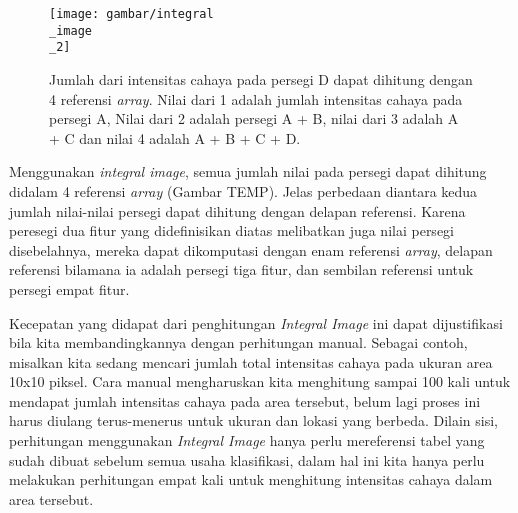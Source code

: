 \begin{figure}[H]
  \centering{}
	\texttt{[image: gambar/integral\\\_image\\\_2]}
  \caption{Jumlah dari intensitas cahaya pada persegi D dapat dihitung dengan 4 referensi \textit{array}. Nilai dari 1 adalah jumlah intensitas cahaya pada persegi A, Nilai dari 2 adalah persegi A + B, nilai dari 3 adalah A + C dan nilai 4 adalah A + B + C + D.}
\end{figure}

Menggunakan \emph{integral image}, semua jumlah nilai pada persegi dapat 
dihitung didalam 4 referensi \emph{array} (Gambar TEMP). Jelas perbedaan 
diantara kedua jumlah nilai-nilai persegi dapat dihitung 
dengan delapan referensi. Karena peresegi dua fitur yang 
didefinisikan diatas melibatkan juga nilai persegi disebelahnya, 
mereka dapat dikomputasi dengan enam referensi \emph{array}, delapan referensi
bilamana ia adalah persegi tiga fitur, dan sembilan referensi untuk 
persegi empat fitur.

Kecepatan yang didapat dari penghitungan \emph{Integral Image} ini dapat dijustifikasi 
bila kita membandingkannya dengan perhitungan manual. Sebagai contoh, misalkan 
kita sedang mencari jumlah total intensitas cahaya pada ukuran area 10x10 
piksel. Cara manual mengharuskan kita menghitung sampai 100 kali untuk mendapat 
jumlah intensitas cahaya pada area tersebut, belum lagi proses ini harus 
diulang terus-menerus untuk ukuran dan lokasi yang berbeda. Dilain sisi, 
perhitungan menggunakan \emph{Integral Image} hanya perlu mereferensi tabel yang 
sudah dibuat sebelum semua usaha klasifikasi, dalam hal ini kita hanya perlu 
melakukan perhitungan empat kali untuk menghitung intensitas cahaya dalam area 
tersebut.

